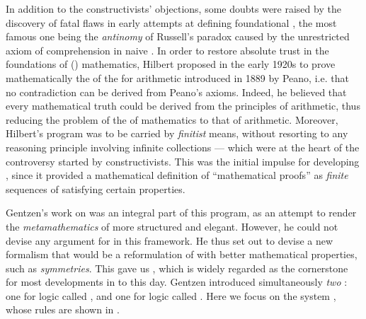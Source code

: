 \AP
In addition to the constructivists' objections, some doubts were raised by the
discovery of fatal flaws in early attempts at defining foundational
, the most famous one being the \emph{antinomy} of
Russell's paradox caused by the unrestricted axiom of comprehension in naive
. In order to restore absolute trust in the foundations of
() mathematics, Hilbert proposed in the early 1920s to prove
mathematically the  of the  for arithmetic
introduced in 1889 by Peano, i.e. that no contradiction can be derived
from Peano's axioms. Indeed, he believed that every mathematical truth could be
derived from the principles of arithmetic, thus reducing the problem of the
 of mathematics to that of arithmetic. Moreover, Hilbert's program
was to be carried by \emph{finitist} means, without resorting to any reasoning
principle involving infinite collections --- which were at the heart of the
controversy started by constructivists. This was the initial impulse for
developing , since it provided a mathematical definition of
``mathematical proofs'' as \emph{finite} sequences of  satisfying
certain properties.

\AP
Gentzen's work on  was an integral part of this program,
as an attempt to render the \emph{metamathematics} of  more
structured and elegant. However, he could not devise any argument for
 in this framework. He thus set out to devise a new formalism
that would be a reformulation of  with better mathematical
properties, such as \emph{symmetries}. This gave us ,
which is widely regarded as the cornerstone for most developments in  to this day. Gentzen introduced simultaneously \emph{two} : one for  logic called , and one for
 logic called . Here we focus on the
 system , whose rules are shown in
.


